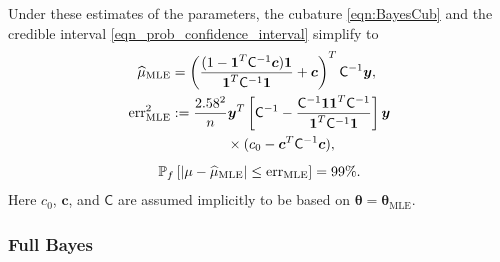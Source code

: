 \documentclass[twocolumn]{svjour3}          %
\newcommand{\bm}[1]{\boldsymbol{#1}}
\newcommand{\vtheta}{{\bm{\theta}}}
\newcommand{\vc}{\bm{c}}
\newcommand{\vy}{\bm{y}}
\newcommand{\vone}{\bm{1}}
\newcommand{\mC}{\mathsf{C}}
\newcommand{\mCInv}{{\mathsf{C}^{-1}}}
\newcommand{\hmu}{\widehat{\mu}}
\newcommand{\MLE}{\text{MLE}}
\newcommand{\err}{\textup{err}}
\begin{document}
Under these estimates of the parameters, the cubature \eqref{eqn:BayesCub} and the credible interval \eqref{eqn_prob_confidence_interval} simplify to 
\begin{align} \label{eqn:cubMLE}
\hmu_\MLE  &= 
\left(
\frac{ (1 - \vone^T  \mCInv\vc )  \vone }{ \vone^T \mCInv \vone}   +  \vc 
\right)^T  \mCInv \vy, \\
\nonumber 
\err_\MLE^2 & : = \frac{2.58^2}{n}
 \vy^T \left[ \mCInv - 
\frac{ \mCInv \vone \vone^T \mCInv }{\vone^T\mCInv \vone}
\right] \vy \\
&\qquad \qquad \times 
(c_0 - \vc^T\mC^{-1}\vc ),
\end{align}
\begin{equation}
\label{eqn_prob_CI_MLE}
\mathbb{P}_f \left[
|\mu-\hmu_\MLE| \leq \err_\MLE \right]  = 99\%.
\end{equation}
Here $c_0$, $\vc$, and $\mC$ are assumed implicitly to be based on $\vtheta = \vtheta_\MLE$.

\subsubsection{Full Bayes}
\end{document}
